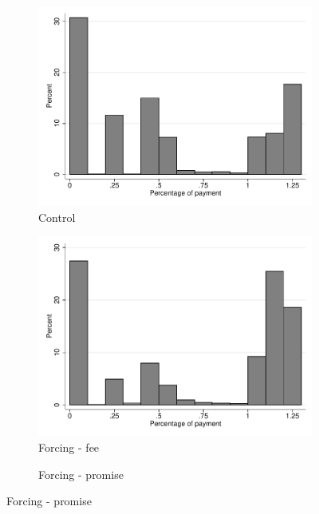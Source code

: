 \documentclass[11pt]{article}
\begin{document}
\begin{figure}[H]
        \caption{Percentage of payments}
    \label{perc_payments}
    \begin{center}
    \begin{subfigure}{.31\textwidth}
    \caption{Control}
        \centering
        \includegraphics[width=\textwidth]{Figuras/hist_porc_pay_pro_1.pdf}
    \end{subfigure}
    \begin{subfigure}{.31\textwidth}
    \caption{Forcing - fee}
        \centering
        \includegraphics[width=\textwidth]{Figuras/hist_porc_pay_pro_2.pdf}
    \end{subfigure}   
     \begin{subfigure}{.31\textwidth}
    \caption{Forcing - promise}

\end{subfigure}
\end{center}
\end{figure}
\end{document}
